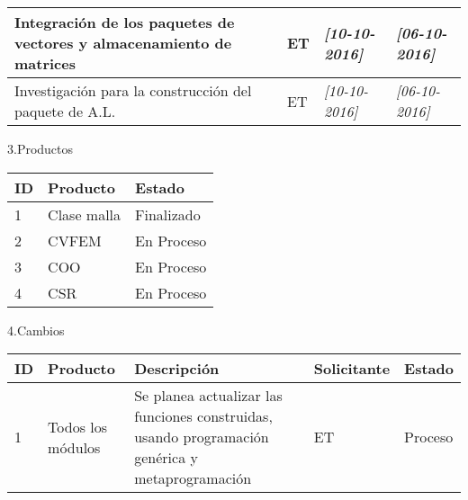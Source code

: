 \documentclass[12pt]{report}
\numberwithin{equation}{section}
\begin{document}
\begin{flushleft}
\begin{longtable}[H]{|m{5cm}|m{3cm}|m{3cm}|m{3cm}|}
\endlastfoot
\hline
\hline
\small{ Integraci\'on de los paquetes de vectores y almacenamiento de matrices} & \small{ET} &\small{ \textit{[10-10-2016]}} & \small{\textit{[06-10-2016]}}\\
\hline
\small{ Investigaci\'on para la construcci\'on del paquete de A.L.} & \small{ET} &\small{ \textit{[10-10-2016]}} & \small{\textit{[06-10-2016]}}\\
\hline
\hline
\end{longtable}

\newpage

\large{3.Productos }
\begin{table}[H]
\begin{tabular}{|m{0.5cm}|m{7.5cm}|m{6cm}|}
\hline 
\textbf{ID } & \textbf{Producto} & \textbf{Estado} \\
\hline
\hline
 1 & \small{Clase malla} & \small{Finalizado}\\
\hline
 2 & \small{CVFEM} & \small{En Proceso}\\
\hline
 3 & \small{COO} & \small{En Proceso}\\
\hline
 4 & \small{CSR} & \small{En Proceso}\\
\hline
\end{tabular}
\label{tabla: TABLA CE Productos}
\end{table}



\large{4.Cambios}\\

\begin{table}[H]
\begin{tabular}{|m{0.5cm}|m{2cm}|m{4.5cm}|m{3.5cm}|m{3.5cm}|}
\hline 
\textbf{ID} & \textbf{Producto} & \textbf{Descripci\'on} & \textbf{Solicitante} & \textbf{Estado}  \\
\hline
\hline
1 & \small{Todos los módulos}  & \small{Se planea actualizar las funciones construidas, usando programaci\'on genérica y metaprogramaci\'on} &\small{ET} & \small{Proceso}\\
\hline
\end{tabular}
\label{tabla: TABLA CE Cambios Seg}
\end{table}




\end{flushleft}
\end{document}
